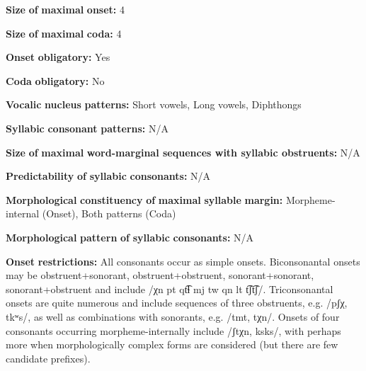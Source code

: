 \begin{styleBody}
\textbf{Size} \textbf{of} \textbf{maximal} \textbf{onset:} 4
\end{styleBody}

\begin{styleBody}
\textbf{Size} \textbf{of} \textbf{maximal} \textbf{coda:} 4
\end{styleBody}

\begin{styleBody}
\textbf{Onset} \textbf{obligatory:} Yes
\end{styleBody}

\begin{styleBody}
\textbf{Coda} \textbf{obligatory:} No
\end{styleBody}

\begin{styleBody}
\textbf{Vocalic} \textbf{nucleus} \textbf{patterns:} Short vowels, Long vowels, Diphthongs
\end{styleBody}

\begin{styleBody}
\textbf{Syllabic} \textbf{consonant} \textbf{patterns:} N/A
\end{styleBody}

\begin{styleBody}
\textbf{Size} \textbf{of} \textbf{maximal} \textbf{word{}-marginal sequences with syllabic obstruents:} N/A
\end{styleBody}

\begin{styleBody}
\textbf{Predictability} \textbf{of} \textbf{syllabic} \textbf{consonants:} N/A
\end{styleBody}

\begin{styleBody}
\textbf{Morphological} \textbf{constituency} \textbf{of} \textbf{maximal} \textbf{syllable} \textbf{margin:} Morpheme-internal (Onset), Both patterns (Coda)
\end{styleBody}

\begin{styleBody}
\textbf{Morphological} \textbf{pattern} \textbf{of} \textbf{syllabic} \textbf{consonants:} N/A
\end{styleBody}

\begin{styleBody}
\textbf{Onset} \textbf{restrictions:} All consonants occur as simple onsets. Biconsonantal onsets may be obstruent+sonorant, obstruent+obstruent, sonorant+sonorant, sonorant+obstruent and include /χn pt qt͡ɬ mj tw qn lt t͡ʃt͡ʃ/. Triconsonantal onsets are quite numerous and include sequences of three obstruents, e.g. /pʃχ, tkʷs/, as well as combinations with sonorants, e.g. /tmt, tχn/. Onsets of four consonants occurring morpheme-internally include /ʃtχn, ksks/, with perhaps more when morphologically complex forms are considered (but there are few candidate prefixes).
\end{styleBody}

